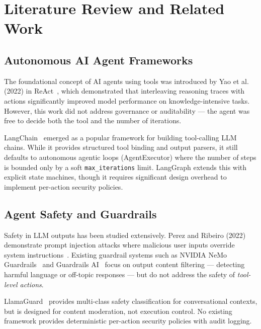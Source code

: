 \chapter{Literature Review and Related Work}

\section{Autonomous AI Agent Frameworks}

The foundational concept of AI agents using tools was introduced by Yao et al. (2022) in ReAct~\cite{yao2022react}, which demonstrated that interleaving reasoning traces with actions significantly improved model performance on knowledge-intensive tasks. However, this work did not address governance or auditability — the agent was free to decide both the tool and the number of iterations.

LangChain~\cite{langchain2023} emerged as a popular framework for building tool-calling LLM chains. While it provides structured tool binding and output parsers, it still defaults to autonomous agentic loops (AgentExecutor) where the number of steps is bounded only by a soft \texttt{max\_iterations} limit. LangGraph extends this with explicit state machines, though it requires significant design overhead to implement per-action security policies.

\section{Agent Safety and Guardrails}

Safety in LLM outputs has been studied extensively. Perez and Ribeiro (2022) demonstrate prompt injection attacks where malicious user inputs override system instructions~\cite{perez2022ignore}. Existing guardrail systems such as NVIDIA NeMo Guardrails~\cite{rebedea2023nemo} and Guardrails AI~\cite{guardrails2023} focus on output content filtering — detecting harmful language or off-topic responses — but do not address the safety of \textit{tool-level actions}.

LlamaGuard~\cite{inan2023llamaguard} provides multi-class safety classification for conversational contexts, but is designed for content moderation, not execution control. No existing framework provides deterministic per-action security policies with audit logging.

